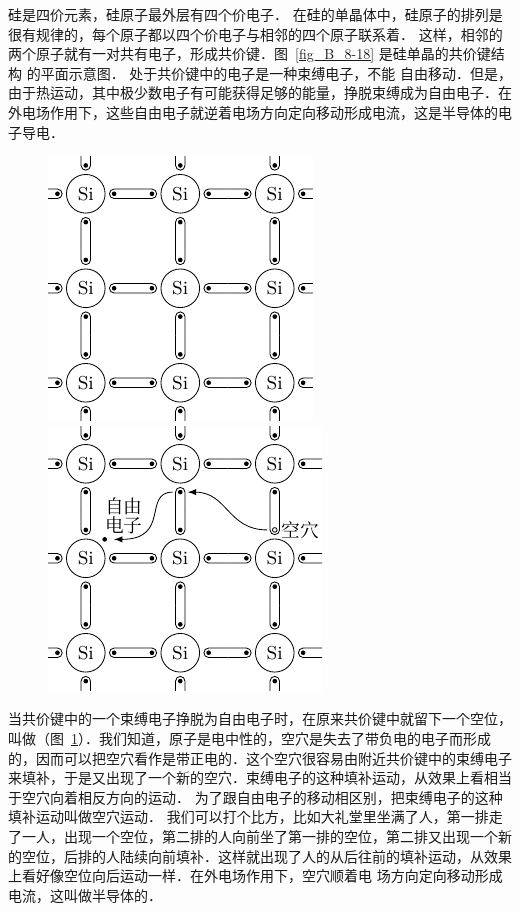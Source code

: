 硅是四价元素，硅原子最外层有四个价电子．
在硅的单晶体中，硅原子的排列是很有规律的，每个原子都以四个价电子与相邻的四个原子联系着．
这样，相邻的两个原子就有一对共有电子，形成共价键．图~\ref{fig_B_8-18} 是硅单晶的共价键结构
的平面示意图．
处于共价键中的电子是一种束缚电子，不能
自由移动．但是，由于热运动，其中极少数电子有可能获得足够的能量，挣脱束缚成为自由电子．在外电场作用下，这些自由电子就逆着电场方向定向移动形成电流，这是半导体的电子导电．
\begin{figure}[htbp]
    \centering
    \begin{minipage}[t]{0.48\textwidth}
        \centering
        \includegraphics{fig/B/8-18.pdf}
        \caption{}\label{fig_B_8-18}
    \end{minipage}
    \begin{minipage}[t]{0.48\textwidth}
        \centering
        \includegraphics{fig/B/8-19.pdf}
        \caption{}\label{fig_B_8-19}
    \end{minipage}
\end{figure}

当共价键中的一个束缚电子挣脱为自由电子时，在原来共价键中就留下一个空位，叫做（图~\ref{fig_B_8-19}）．我们知道，原子是电中性的，空穴是失去了带负电的电子而形成的，因而可以把空穴看作是带正电的．这个空穴很容易由附近共价键中的束缚电子来填补，于是又出现了一个新的空穴．束缚电子的这种填补运动，从效果上看相当于空穴向着相反方向的运动．
为了跟自由电子的移动相区别，把束缚电子的这种填补运动叫做空穴运动．
我们可以打个比方，比如大礼堂里坐满了人，第一排走了一人，出现一个空位，第二排的人向前坐了第一排的空位，第二排又出现一个新的空位，后排的人陆续向前填补．这样就出现了人的从后往前的填补运动，从效果上看好像空位向后运动一样．在外电场作用下，空穴顺着电
场方向定向移动形成电流，这叫做半导体的．

